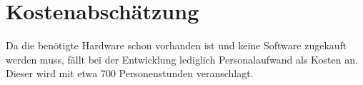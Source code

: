 
\section{Kostenabschätzung}

Da die benötigte Hardware schon vorhanden ist und keine Software zugekauft werden muss, fällt bei der Entwicklung lediglich Personalaufwand als Kosten an. Dieser wird mit etwa 700 Personenstunden veranschlagt.


